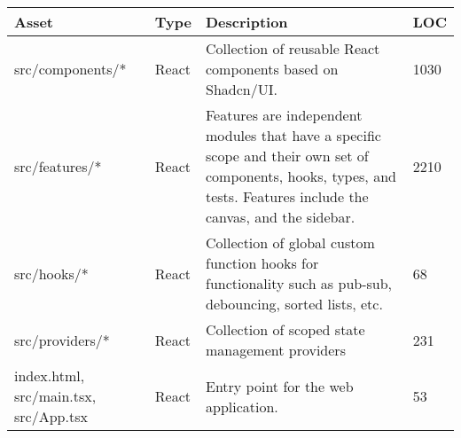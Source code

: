 \begin{table}[h]
    \centering


    \begin{tabular}{|p{5cm}|p{1.5cm}|p{6cm}|p{1cm}|}
        \hline
        \rowcolor{white} %
        \textbf{Asset}                        & \textbf{Type} & \textbf{Description}                                                                                                                                                & \textbf{LOC} \\
        \hline
        \rowcolor{reactLight}
        src/components/*                      & React         & Collection of reusable React components based on Shadcn/UI.                                                                                                         & 1030         \\
        \hline
        \rowcolor{reactLight}
        src/features/*                        & React         & Features are independent modules that have a specific scope and their own set of components, hooks, types, and tests. Features include the canvas, and the sidebar. & 2210         \\
        \hline
        \rowcolor{reactLight}
        src/hooks/*                           & React         & Collection of global custom function hooks for functionality such as pub-sub, debouncing, sorted lists, etc.                                                        & 68           \\
        \hline
        \rowcolor{reactLight}
        src/providers/*                       & React         & Collection of scoped state management providers                                                                                                                     & 231          \\
        \hline
        \rowcolor{reactLight}
        index.html, src/main.tsx, src/App.tsx & React         & Entry point for the web application.                                                                                                                                & 53           \\


\end{tabular}
\end{table}
